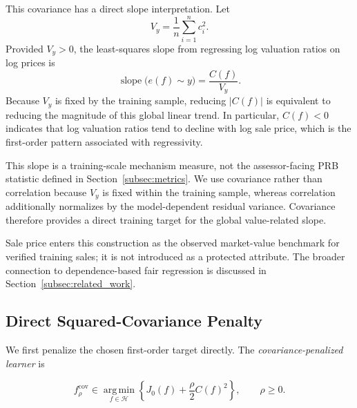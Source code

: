 \documentclass[10pt]{article}
\theoremstyle{definition}
\newcommand{\1}{\mathbf{1}}
\newcommand{\Hcal}{\mathcal{H}}
\newcommand{\argminop}{\operatorname*{arg\,min}}
\begin{document}
This covariance has a direct slope interpretation. Let
\[
V_y=\frac{1}{n}\sum_{i=1}^n c_i^2.
\]
Provided $V_y>0$, the least-squares slope from regressing log valuation ratios on log prices is
\begin{equation}
\label{eq:covariance_slope}
\operatorname{slope}\bigl(e(f)\sim y\bigr)
=
\frac{C(f)}{V_y}.
\end{equation}
Because $V_y$ is fixed by the training sample, reducing $|C(f)|$ is equivalent to reducing the magnitude of this global linear trend. In particular, $C(f)<0$ indicates that log valuation ratios tend to decline with log sale price, which is the first-order pattern associated with regressivity.

{This slope is a training-scale mechanism measure, not the assessor-facing PRB statistic defined in Section~\ref{subsec:metrics}. We use covariance rather than correlation because $V_y$ is fixed within the training sample, whereas correlation additionally normalizes by the model-dependent residual variance. Covariance therefore provides a direct training target for the global value-related slope.}

{Sale price enters this construction as the observed market-value benchmark for verified training sales; it is not introduced as a protected attribute. The broader connection to dependence-based fair regression is discussed in Section~\ref{subsec:related_work}.}


\subsection{{Direct Squared-Covariance Penalty}}
\label{subsec:direct_penalty}

{We first penalize the chosen first-order target directly. The \emph{covariance-penalized learner} is}


{
\begin{equation}
\label{eq:direct_penalty}
f_\rho^{\mathrm{cov}}
\in
\argminop_{f\in\Hcal}
\left\{
J_0(f)+\frac{\rho}{2}C(f)^2
\right\},
\qquad
\rho\geq 0.
\end{equation}
}
\end{document}

